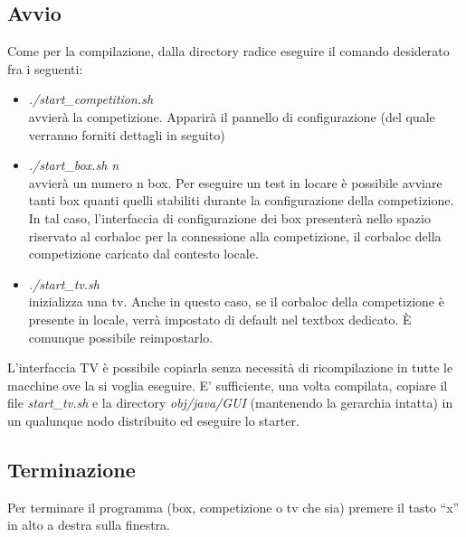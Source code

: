 \subsection{Avvio}
Come per la compilazione, dalla directory radice eseguire il comando desiderato fra i seguenti:
\begin{itemize}
\item \emph{./start\_competition.sh}\\
avvier\`{a} la competizione. Apparir\`{a} il pannello di configurazione (del quale verranno forniti dettagli in seguito)
\item \emph{./start\_box.sh n}\\
avvier\`{a} un numero n box. Per eseguire un test in locare \`{e} possibile avviare tanti box quanti quelli stabiliti durante la configurazione
della competizione. In tal caso, l'interfaccia di configurazione dei box presenter\`{a} nello spazio riservato al corbaloc per la connessione
alla competizione, il corbaloc della competizione caricato dal contesto locale.
\item \emph{./start\_tv.sh}\\
inizializza una tv. Anche in questo caso, se il corbaloc della competizione \`{e} presente in locale, verr\`{a} impostato di default nel textbox
dedicato. \`{E} comunque possibile reimpostarlo.
\end{itemize}
L'interfaccia TV \`{e} possibile copiarla senza necessit\`{a} di ricompilazione in tutte le macchine ove la si voglia eseguire. E' sufficiente,
una volta compilata, copiare il file \emph{start\_tv.sh} e la directory \emph{obj/java/GUI} (mantenendo la gerarchia intatta) in un qualunque
nodo distribuito ed eseguire lo starter.
\subsection{Terminazione}
Per terminare il programma (box, competizione o tv che sia) premere il tasto ``x'' in alto a destra sulla finestra.
